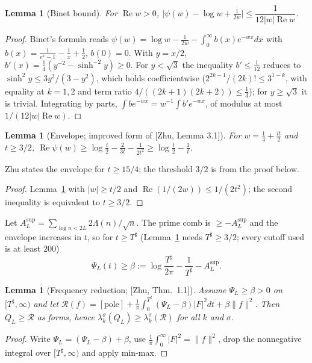 \documentclass[11pt]{amsart}
\newcommand{\re}{\operatorname{Re}}
\newcommand{\pole}{\mathrm{pole}}
\newcommand{\Tsh}{T^{\sharp}}
\newtheorem{lemma}[theorem]{Lemma}
\theoremstyle{definition}
\theoremstyle{remark}
\numberwithin{equation}{section}
\begin{document}
\begin{lemma}[Binet bound]\label{lem:B}
For $\re w>0$, $\bigl|\psi(w)-\log w+\tfrac1{2w}\bigr|\le\dfrac1{12|w|\re w}$.
\end{lemma}
\begin{proof}
Binet's formula reads $\psi(w)=\log w-\frac1{2w}-\int_0^\infty b(x)e^{-wx}dx$ with $b(x)=\frac1{e^x-1}-\frac1x+\frac12$, $b(0)=0$. With $y=x/2$, $b'(x)=\tfrac14(y^{-2}-\sinh^{-2}y)\ge0$. For $y<\sqrt3$ the inequality $b'\le\tfrac1{12}$ reduces to $\sinh^2y\le3y^2/(3-y^2)$, which holds coefficientwise ($2^{2k-1}/(2k)!\le3^{1-k}$, with equality at $k=1,2$ and term ratio $4/((2k+1)(2k+2))\le\tfrac13$); for $y\ge\sqrt3$ it is trivial. Integrating by parts, $\int be^{-wx}=w^{-1}\int b'e^{-wx}$, of modulus at most $1/(12|w|\re w)$.
\end{proof}

\begin{lemma}[Envelope; improved form of {[Zhu, Lemma 3.1]}]\label{lem:E}
For $w=\tfrac14+\tfrac{it}2$ and $t\ge3/2$, $\re\psi(w)\ge\log\tfrac t2-\tfrac2{3t}-\tfrac1{2t^2}\ge\log\tfrac t2-\tfrac1t$.
\end{lemma}
\noindent Zhu states the envelope for $t\ge15/4$; the threshold $3/2$ is from the proof below.
\begin{proof}
Lemma~\ref{lem:B} with $|w|\ge t/2$ and $\re(1/(2w))\le1/(2t^2)$; the second inequality is equivalent to $t\ge3/2$.
\end{proof}

Let $A_L^{\sup}=\sum_{\log n<2L}2\Lambda(n)/\sqrt n$. The prime comb is $\ge-A_L^{\sup}$ and the envelope increases in $t$, so for $t\ge\Tsh$ (Lemma~\ref{lem:E} needs $\Tsh\ge3/2$; every cutoff used is at least $200$)
\begin{equation}\label{eq:beta}
\Psi_L(t)\ge\beta:=\log\frac{\Tsh}{2\pi}-\frac1{\Tsh}-A_L^{\sup}.
\end{equation}

\begin{lemma}[Frequency reduction; {[Zhu, Thm.~1.1]}]\label{lem:R}
Assume $\Psi_L\ge\beta>0$ on $[\Tsh,\infty)$ and let $\mathcal R(f)=[\pole]+\frac1\pi\int_0^{\Tsh}(\Psi_L-\beta)|F|^2dt+\beta\|f\|^2$. Then $Q_L\ge\mathcal R$ as forms, hence $\lambda_k^\sigma(Q_L)\ge\lambda_k^\sigma(\mathcal R)$ for all $k$ and $\sigma$.
\end{lemma}
\begin{proof}
Write $\Psi_L=(\Psi_L-\beta)+\beta$, use $\frac1\pi\int_0^\infty|F|^2=\|f\|^2$, drop the nonnegative integral over $[\Tsh,\infty)$ and apply min-max.
\end{proof}
\end{document}
